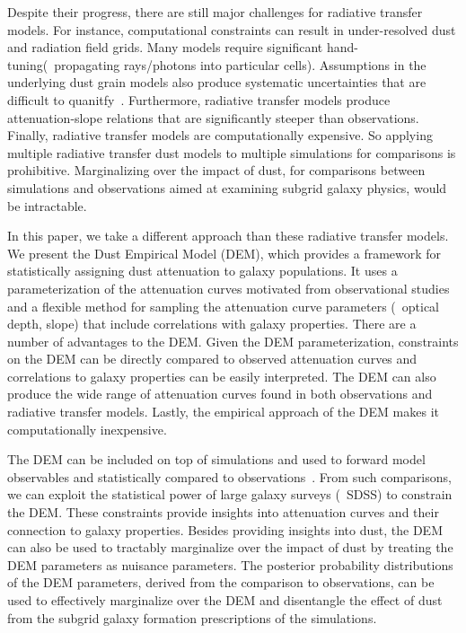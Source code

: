 Despite their progress, there are still major challenges for radiative transfer
models. For instance, computational constraints can result in under-resolved
dust and radiation field grids. Many models require significant
hand-tuning(\eg~propagating rays/photons into particular cells). Assumptions in
the underlying dust grain models also produce systematic uncertainties that are
difficult to quanitfy~\citep[see][for a review]{steinacker2013}. Furthermore,
radiative transfer models produce attenuation-slope relations that are
significantly steeper than observations. Finally, radiative transfer models 
are computationally expensive. So applying multiple radiative transfer dust
models to multiple simulations for comparisons is prohibitive. Marginalizing over
the impact of dust, for comparisons between simulations and observations aimed 
at examining subgrid galaxy physics, would be intractable. 

In this paper, we take a different approach than these radiative transfer
models. We present the Dust Empirical Model (DEM), which provides a framework
for statistically assigning dust attenuation to galaxy populations. It uses a
parameterization of the attenuation curves motivated from observational
studies~\citep[\eg][]{noll2009} and a flexible method for sampling the
attenuation curve parameters (\eg~optical depth, slope) that include 
correlations with galaxy properties. There are a number of advantages to the
DEM. Given the DEM parameterization, constraints on the DEM can be directly 
compared to observed attenuation curves and correlations to galaxy properties
can be easily interpreted. The DEM can also produce the wide range of 
attenuation curves found in both observations and radiative transfer models. 
Lastly, the empirical approach of the DEM makes it computationally inexpensive. 

The DEM can be included on top of simulations and used to forward model
observables and statistically compared to
observations~\citep[\eg][]{nelson2018, baes2019, trcka2020, dickey2020}. From
such comparisons, we can exploit the statistical power of large galaxy surveys 
(\eg~SDSS) to constrain the DEM. These constraints provide insights into
attenuation curves and their connection to galaxy properties. Besides 
providing insights into dust, the DEM can also be used to tractably marginalize
over the impact of dust by treating the DEM parameters as nuisance parameters. 
The posterior probability distributions of the DEM parameters, derived from 
the comparison to observations, can be used to effectively marginalize over 
the DEM and disentangle the effect of dust from the subgrid galaxy formation 
prescriptions of the simulations. 

